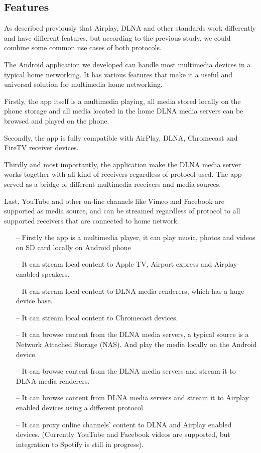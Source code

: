 \subsection{Features}
As described previously that Airplay, DLNA and other standards work
differently and have different features, but according to the previous study,
we could combine some common use cases of both protocols.

The Android application we developed can handle most multimedia devices in 
a typical home networking. It has various features that make it a useful and
universal solution for multimedia home networking.

Firstly, the app itself is a multimedia playing, all media stored locally on the
phone storage and all media located in the home DLNA media servers can be
browsed and played on the phone.

Secondly, the app is fully compatible with AirPlay, DLNA, Chromecast and FireTV
receiver devices. 

Thirdly and most importantly, the application make the DLNA media server works
together with all kind of receivers regardless of protocol used. The app served
as a bridge of different multimedia receivers and media sources.

Last, YouTube and other on-line channels like Vimeo and Facebook are supported
as media source, and can be streamed regardless of protocol to all supported
receivers that are connected to home network.


\begin{itemize}
\item[--]Firstly the app is a multimedia player, it can play music, photos and videos 
on SD card locally on Android phone
\item[--]It can stream local content to Apple TV, Airport express and Airplay-enabled 
speakers.
\item[--]It can stream local content to DLNA media renderers, which has a huge device 
base.
\item[--]It can stream local content to Chromecast devices.
\item[--]It can browse content from the DLNA media servers, a typical source is a 
Network Attached Storage (NAS). And play the media locally on the Android device.
\item[--]It can browse content from the DLNA media servers and stream it to DLNA media 
renderers.
\item[--]It can browse content from DLNA media servers and stream it to Airplay enabled 
devices using a different protocol.
\item[--]It can proxy online channels' content to DLNA and Airplay enabled devices. 
(Currently YouTube and Facebook videos are supported, but integration to Spotify is still 
in progress).
\end{itemize}

